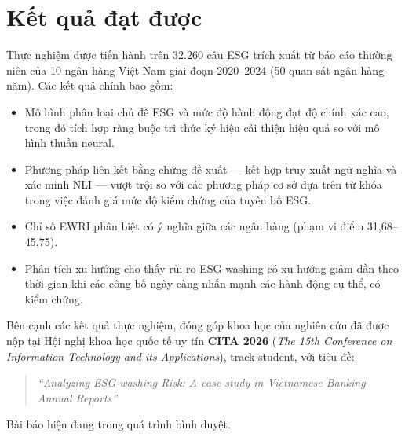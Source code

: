 \section{Kết quả đạt được}
Thực nghiệm được tiến hành trên 32.260 câu ESG trích xuất từ báo cáo thường niên của 10 ngân hàng Việt Nam giai đoạn 2020--2024 (50 quan sát ngân hàng-năm). Các kết quả chính bao gồm:
\begin{itemize}
    \item Mô hình phân loại chủ đề ESG và mức độ hành động đạt độ chính xác cao, trong đó tích hợp ràng buộc tri thức ký hiệu cải thiện hiệu quả so với mô hình thuần neural.
    \item Phương pháp liên kết bằng chứng đề xuất --- kết hợp truy xuất ngữ nghĩa và xác minh NLI --- vượt trội so với các phương pháp cơ sở dựa trên từ khóa trong việc đánh giá mức độ kiểm chứng của tuyên bố ESG.
    \item Chỉ số EWRI phân biệt có ý nghĩa giữa các ngân hàng (phạm vi điểm \mbox{31,68--45,75}).
    \item Phân tích xu hướng cho thấy rủi ro ESG-washing có xu hướng giảm dần theo thời gian khi các công bố ngày càng nhấn mạnh các hành động cụ thể, có kiểm chứng.
\end{itemize}

Bên cạnh các kết quả thực nghiệm, đóng góp khoa học của nghiên cứu đã được nộp tại Hội nghị khoa học quốc tế uy tín \textbf{CITA 2026} (\textit{The 15th Conference on Information Technology and its Applications}), track student, với tiêu đề:

\begin{quote}
\textit{``Analyzing ESG-washing Risk: A case study in Vietnamese Banking Annual Reports''}
\end{quote}

\noindent Bài báo hiện đang trong quá trình bình duyệt.


